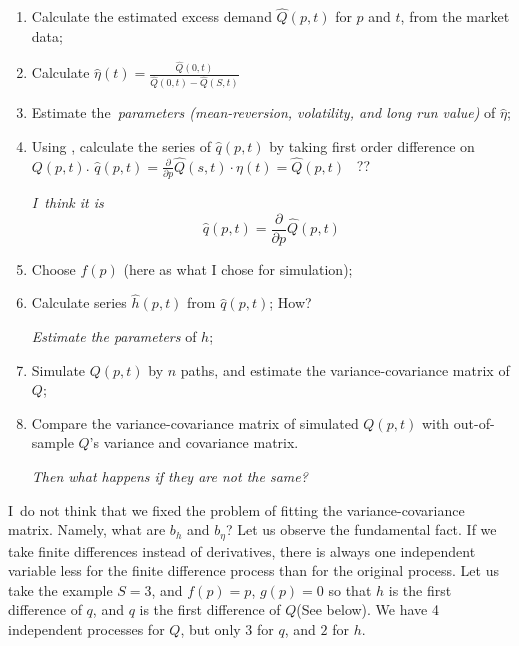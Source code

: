 \documentclass{article}
\begin{document}
\begin{enumerate}
\item Calculate the estimated excess demand $\hat{Q}(p,t)$ for $p$ and $t$,
from the market data;

\item Calculate $\hat{\eta}(t)=\frac{\hat{Q}(0,t)}{\hat{Q}(0,t)-\hat{Q}(S,t)}
$

\item Estimate the\textit{\ parameters (mean-reversion, volatility, and long
run value) }of $\hat{\eta}$;

\item Using \cite{equ_Q_A}, calculate the series of $\hat{q}(p,t)$ by taking
first order difference on $Q(p,t)$. \newline
$\hat{q}(p,t)=\frac{\partial }{\partial p}\hat{Q}(s,t)\cdot \eta (t)=\hat{Q}%
(p,t)$ \ ??

\textit{I\ think it is}%
\begin{equation*}
\hat{q}(p,t)=\frac{\partial }{\partial p}\hat{Q}(p,t)
\end{equation*}

\item Choose $f(p)$ (here as what I chose for simulation);

\item Calculate series $\hat{h}(p,t)$ from $\hat{q}(p,t)$; How?

\textit{Estimate the parameters} of $h$;

\item Simulate $Q(p,t)$ by $n$ paths, and estimate the variance-covariance
matrix of $Q$;

\item Compare the variance-covariance matrix of simulated $Q(p,t)$ with
out-of-sample $Q$'s variance and covariance matrix.

\textit{Then what happens if they are not the same?}
\end{enumerate}

I\ do not think that we fixed the problem of fitting the variance-covariance
matrix. Namely, what are $b_{h}$ and $b_{\eta }$? Let us observe the
fundamental fact. If we take finite differences instead of derivatives,
there is always one independent variable less for the finite difference
process than for the original process. Let us take the example $S=3$, and $%
f(p)=p$, $g(p)=0$ so that $h$ is the first difference of $q$, and $q$ is the
first difference of $Q$(See below). We have 4 independent processes for $Q$,
but only $3$ for $q$, and $2$ for $h$.
\end{document}
